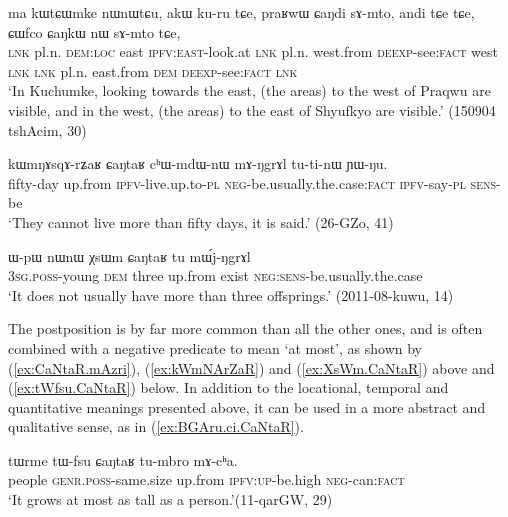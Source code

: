 \begin{exe}
\ex \label{ex:praRwW.CaNdi}
 \gll ma kɯtɕɯmke nɯnɯtɕu, akɯ ku-ru tɕe, praʁwɯ ɕaŋdi sɤ-mto, 
andi tɕe tɕe, ɕɯfco ɕaŋkɯ nɯ sɤ-mto tɕe, \\
\textsc{lnk} pl.n. \textsc{dem}:\textsc{loc} east \textsc{ipfv}:\textsc{east}-look.at \textsc{lnk} pl.n. west.from \textsc{deexp}-see:\textsc{fact} west \textsc{lnk} \textsc{lnk} pl.n. east.from \textsc{dem} \textsc{deexp}-see:\textsc{fact} \textsc{lnk} \\
\glt `In Kuchumke, looking towards the east, (the areas) to the west of Praqwu are visible, and in the west, (the areas) to the east of Shyufkyo are visible.' (150904 tshAcim, 30)
\end{exe}

\begin{exe}
\ex \label{ex:kWmNArZaR}
 \gll kɯmŋɤsqɤ-rʑaʁ ɕaŋtaʁ cʰɯ-mdɯ-nɯ mɤ-ŋgrɤl tu-ti-nɯ ɲɯ-ŋu.  \\
 fifty-day up.from \textsc{ipfv}-live.up.to-\textsc{pl} \textsc{neg}-be.usually.the.case:\textsc{fact} \textsc{ipfv}-say-\textsc{pl} \textsc{sens}-be \\
\glt `They cannot live more than fifty days, it is said.' (26-GZo, 41)
\end{exe}

\begin{exe}
\ex \label{ex:XsWm.CaNtaR}
 \gll ɯ-pɯ nɯnɯ χsɯm ɕaŋtaʁ tu mɯ́j-ŋgrɤl \\
\textsc{3sg}.\textsc{poss}-young \textsc{dem} three up.from exist \textsc{neg}:\textsc{sens}-be.usually.the.case \\
\glt  `It does not usually have more than three offsprings.' (2011-08-kuwu, 14)
\end{exe}

The postposition   is by far more common than all the other ones, and is often combined with a negative predicate to mean `at most', as shown by (\ref{ex:CaNtaR.mAzri}), (\ref{ex:kWmNArZaR}) and (\ref{ex:XsWm.CaNtaR}) above and (\ref{ex:tWfsu.CaNtaR}) below. In addition to the locational, temporal and quantitative meanings presented above, it can be used in a more abstract and qualitative sense, as in (\ref{ex:BGAru.ci.CaNtaR}).

\begin{exe}
\ex \label{ex:tWfsu.CaNtaR}
 \gll tɯrme tɯ-fsu ɕaŋtaʁ tu-mbro mɤ-cʰa. \\
people \textsc{genr}.\textsc{poss}-same.size up.from \textsc{ipfv}:\textsc{up}-be.high \textsc{neg}-can:\textsc{fact} \\
\glt `It grows at most as tall as a person.'(11-qarGW, 29)
\end{exe}

